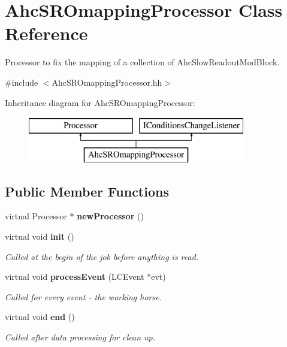 \section{Ahc\-S\-R\-Omapping\-Processor Class Reference}
\label{classAhcSROmappingProcessor}


Processor to fix the mapping of a collection of Ahc\-Slow\-Readout\-Mod\-Block.  




{\ttfamily \#include $<$Ahc\-S\-R\-Omapping\-Processor.\-hh$>$}

Inheritance diagram for Ahc\-S\-R\-Omapping\-Processor\-:\begin{figure}[H]
\begin{center}
\leavevmode
\includegraphics[height=2.000000cm]{classAhcSROmappingProcessor}
\end{center}
\end{figure}
\subsection*{Public Member Functions}
\begin{DoxyCompactItemize}
\item 
virtual Processor $\ast$ {\bfseries new\-Processor} ()\label{classAhcSROmappingProcessor_acdb27fbf3cabcefac542316a507e4ecd}

\item 
virtual void {\bf init} ()
\begin{DoxyCompactList}\small\item\em Called at the begin of the job before anything is read. \end{DoxyCompactList}\item 
virtual void {\bf process\-Event} (L\-C\-Event $\ast$evt)\label{classAhcSROmappingProcessor_a6aed22ae961f2d83301ef5bd3ecbac22}

\begin{DoxyCompactList}\small\item\em Called for every event -\/ the working horse. \end{DoxyCompactList}\item 
virtual void {\bf end} ()\label{classAhcSROmappingProcessor_a1e2654e41cb9d86e674d671e2dffddf8}

\begin{DoxyCompactList}\small\item\em Called after data processing for clean up. \end{DoxyCompactList}\end{DoxyCompactItemize}
